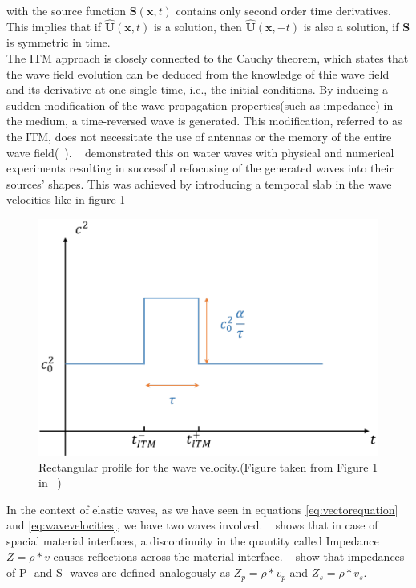 with the source function $\mathbf{S}\left(\mathbf{x},t\right)$ contains only second order time derivatives. This implies that if $\hat{\mathbf{U}}\left(\mathbf{x},t\right)$
is a solution, then $\hat{\mathbf{U}}\left(\mathbf{x}, -t\right)$ is also a solution, if $\mathbf{S}$ is symmetric in time. \\

The \ac{ITM} approach is closely connected to the Cauchy theorem, which states that the wave field evolution can be deduced from the knowledge of thie wave field
and its derivative at one single time, i.e., the initial conditions. By inducing a sudden modification of the wave propagation properties(such as impedance) in the
medium, a time-reversed wave is generated. This modification, referred to as the \ac{ITM}, does not necessitate the use of antennas or the memory of the entire wave
field(~\parencite{Bacot2016}). ~\parencite{Bacot2016} demonstrated this on water waves with physical and numerical experiments resulting in successful refocusing of the generated waves into their
sources' shapes. This was achieved by introducing a temporal slab in the wave velocities like in figure \ref{fig:deltavelocity}

\begin{figure}
    \centering
    \includegraphics[width=0.6\linewidth]{figures/delta_speed.png}
    \caption{Rectangular profile for the wave velocity.(Figure taken from Figure 1 in ~\parencite[Supplementary Material]{Bacot2016})}
    \label{fig:deltavelocity}
\end{figure}

In the context of elastic waves, as we have seen in equations \ref{eq:vectorequation} and \ref{eq:wavevelocities}, we have two waves involved. 
~\parencite[Sec 9.6-Sec 9.8]{leveque_2002} shows that in case of spacial material interfaces, a discontinuity in the quantity called Impedance $Z = \rho * v$
causes reflections across the material interface. ~\parencite[Eq. 1.66 and 1.180]{kaufman} show that impedances of P- and S- waves are defined analogously as
$Z_p = \rho * v_p$ and $Z_s = \rho * v_s$. 
